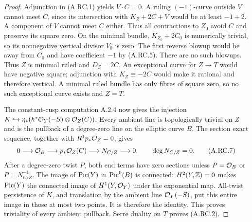 \begin{proof}
Adjunction in (A.RC.1) yields $V\cdot C=0$. A ruling
$(-1)$-curve outside $V$ cannot meet $C$, since its
intersection with $K_Z+2C+V$ would be at least $-1+2$.
A component of $V$ cannot meet $C$ either. Thus all
contractions to $Z_0$ avoid $C$ and preserve its square zero.
On the minimal bundle, $K_{Z_0}+2C_0$ is numerically trivial,
so its nonnegative vertical divisor $V_0$ is zero.
The first reverse blowup would be away from $C_0$ and have
coefficient $-1$ by (A.RC.5). There are no such blowups.
Thus $Z$ is minimal ruled and $D_Z=2C$.
An exceptional curve for $Z\to T$ would have negative square;
adjunction with $K_Z\equiv-2C$ would make it rational and
therefore vertical. A minimal ruled bundle has only fibres
of square zero, so no such exceptional curve exists and $Z=T$.

The constant-cusp computation A.2.4 now gives the injection
$K\hookrightarrow\eta_*(h^*\mathcal O_Y(-S)\otimes\mathcal O_Z(C))$.
Every ambient line is topologically trivial on $Z$ and is
the pullback of a degree-zero line on the elliptic curve $B$.
The section exact sequence, together with $R^1p_*\mathcal O_Z=0$,
gives
\[
 0\longrightarrow\mathcal O_B\longrightarrow p_*\mathcal O_Z(C)
 \longrightarrow N_{C/Z}\longrightarrow0,
 \qquad\deg N_{C/Z}=0.                              \tag{A.RC.7}
\]
After a degree-zero twist $P$, both end terms have zero
sections unless $P=\mathcal O_B$ or $P=N_{C/Z}^{-1}$.
The image of $\operatorname{Pic}(Y)$ in $\operatorname{Pic}^0(B)$ is connected:
$H^2(Y,\mathbb Z)=0$ makes $\operatorname{Pic}(Y)$ the connected image of
$H^1(Y,\mathcal O_Y)$ under the exponential map.
All-twist persistence of $K$, and translation by the ambient
line $\mathcal O_Y(-S)$, put this entire image in those at most two
points. It is therefore the identity. This proves triviality
of every ambient pullback. Serre duality on $T$ proves
(A.RC.2).
\end{proof}



